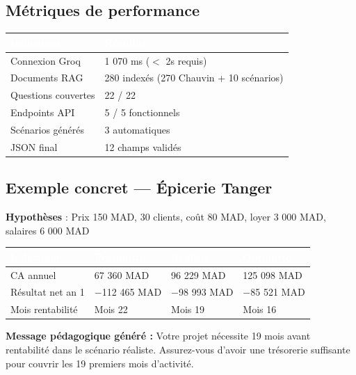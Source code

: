 \documentclass[11pt, a4paper]{article}
\begin{document}
\subsection{Métriques de performance}

\begin{center}
\begin{tabularx}{0.9\textwidth}{X X}
\toprule
\rowcolor{navyblue}\textcolor{white}{\textbf{Indicateur}} & \textcolor{white}{\textbf{Résultat}} \\
\midrule
Connexion Groq & 1 070 ms ($<$ 2s requis) \\
Documents RAG & 280 indexés (270 Chauvin + 10 scénarios) \\
Questions couvertes & 22 / 22 \\
Endpoints API & 5 / 5 fonctionnels \\
Scénarios générés & 3 automatiques \\
JSON final & 12 champs validés \\
\bottomrule
\end{tabularx}
\end{center}

\subsection{Exemple concret — Épicerie Tanger}

\textbf{Hypothèses} : Prix 150 MAD, 30 clients, coût 80 MAD, loyer 3 000 MAD, salaires 6 000 MAD

\begin{center}
\begin{tabularx}{0.95\textwidth}{X X X X}
\toprule
\rowcolor{navyblue}\textcolor{white}{\textbf{Indicateur}} & \textcolor{white}{\textbf{Pessimiste}} & \textcolor{white}{\textbf{Réaliste}} & \textcolor{white}{\textbf{Optimiste}} \\
\midrule
CA annuel & 67 360 MAD & 96 229 MAD & 125 098 MAD \\
Résultat net an 1 & $-$112 465 MAD & $-$98 993 MAD & $-$85 521 MAD \\
Mois rentabilité & Mois 22 & Mois 19 & Mois 16 \\
\bottomrule
\end{tabularx}
\end{center}

\begin{resultbox}
\textbf{Message pédagogique généré :} Votre projet nécessite 19 mois avant rentabilité dans le scénario réaliste. Assurez-vous d'avoir une trésorerie suffisante pour couvrir les 19 premiers mois d'activité.
\end{resultbox}
\end{document}
